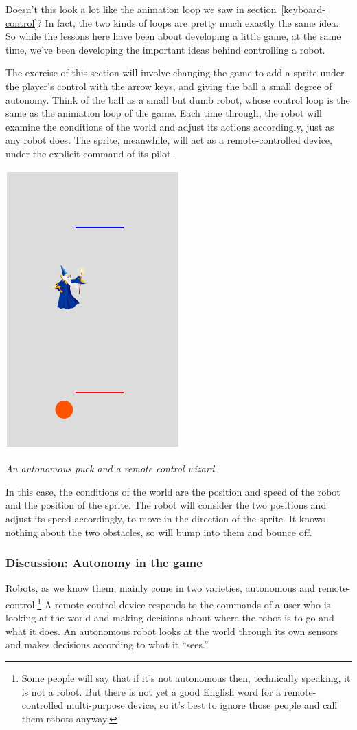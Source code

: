 \documentclass[11pt]{article}
\newcommand{\capt}[1]{\begin{minipage}{0.75\columnwidth}\itshape#1\end{minipage}}
\begin{document}
Doesn't this look a lot like the animation loop we saw in
section~\ref{keyboard-control}?  In fact, the two kinds of loops are
pretty much exactly the same idea.  So while the lessons here have
been about developing a little game, at the same time, we've been
developing the important ideas behind controlling a robot.

The exercise of this section will involve changing the game to add a
sprite under the player's control with the arrow keys, and giving the
ball a small degree of autonomy.  Think of the ball as a small but
dumb robot, whose control loop is the same as the animation loop of
the game.  Each time through, the robot will examine the conditions of
the world and adjust its actions accordingly, just as any robot does.
The sprite, meanwhile, will act as a remote-controlled device, under
the explicit command of its pilot.


\begin{center}
\includegraphics[height=0.5\columnwidth]{game-sprite.png}

\capt{An autonomous puck and a remote control wizard.}
\end{center}


In this case, the conditions of the world are the position and speed
of the robot and the position of the sprite.  The robot will consider
the two positions and adjust its speed accordingly, to move in the
direction of the sprite.  It knows nothing about the two obstacles, so
will bump into them and bounce off.


\subsubsection{Discussion: Autonomy in the game}

Robots, as we know them, mainly come in two varieties, autonomous and
remote-control.\footnote{Some people will say that if it's not
  autonomous then, technically speaking, it is not a robot.  But there
  is not yet a good English word for a remote-controlled multi-purpose
  device, so it's best to ignore those people and call them robots
  anyway.}  A remote-control device responds to the commands of a user
who is looking at the world and making decisions about where the robot
is to go and what it does.  An autonomous robot looks at the world
through its own sensors and makes decisions according to what it
``sees.''
\end{document}
